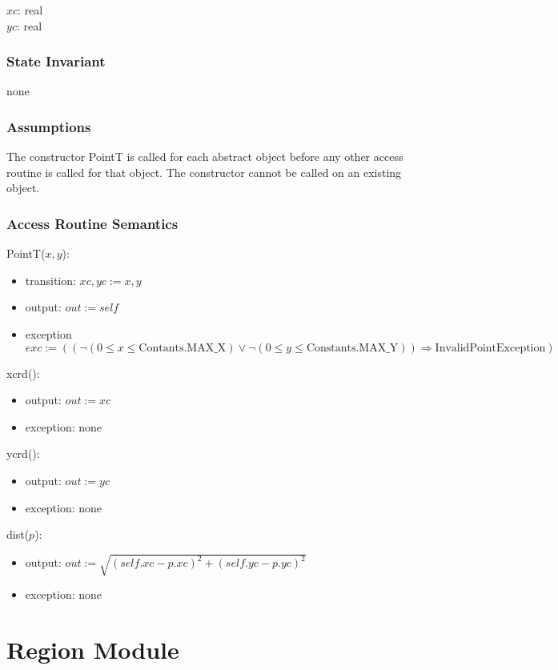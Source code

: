 \documentclass[12pt]{article}
\begin{document}
$xc$: real\\
$yc$: real

\subsubsection* {State Invariant}

none

\subsubsection* {Assumptions}
The constructor PointT is called for each abstract object before any other access routine is called for that
object.  The constructor cannot be called on an existing object.

\subsubsection* {Access Routine Semantics}

PointT($x, y$):
\begin{itemize}
\item transition: $xc, yc := x, y$
\item output: $out := \mathit{self}$
\item exception
 $exc := ((\neg(0 \leq x \leq \mbox{Contants.MAX\_X}) \vee \neg(0 \leq y \leq \mbox{Constants.MAX\_Y})) \Rightarrow
\mbox{InvalidPointException})$
\end{itemize}

\noindent xcrd():
\begin{itemize}
\item output: $out := xc$
\item exception: none
\end{itemize}

\noindent ycrd():
\begin{itemize}
\item output: $out := yc$
\item exception: none
\end{itemize}

\noindent dist($p$):
\begin{itemize}
\item output: $out := \sqrt{(\mathit{self}.xc - p.xc)^2 + (\mathit{self}.yc - p.yc)^2}$
\item exception: none
\end{itemize}

\newpage

\section* {Region Module}
\end{document}
